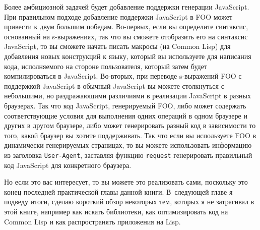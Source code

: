 Более амбициозной задачей будет добавление поддержки генерации JavaScript.  При правильном
подходе добавление поддержки JavaScript в FOO может привести к двум большим победам.
Во-первых, если вы определите синтаксис, основанный на s-выражениях, так что вы сможете
отобразить его на синтаксис JavaScript, то вы сможете начать писать макросы (на Common
Lisp) для добавления новых конструкций к языку, который вы используете для написания кода,
исполняемого на стороне пользователя, который затем будет компилироваться в JavaScript.
Во-вторых, при переводе s-выражений FOO с поддержкой JavaScript в обычный JavaScript вы
можете столкнуться с небольшими, но раздражающими различиями в реализации JavaScript в
разных браузерах.  Так что код JavaScript, генерируемый FOO, либо может содержать
соответствующие условия для выполнения одних операций в одном браузере и других в другом
браузере, либо может генерировать разный код в зависимости то того, какой браузер вы
хотите поддерживать.  Так что если вы используете FOO в динамически генерируемых
страницах, то вы можете использовать информацию из заголовка \lstinline{User-Agent},
заставляя функцию \lstinline{request} генерировать правильный код JavaScript для
конкретного браузера.

Но если это вас интересует, то вы можете это реализовать сами, поскольку это конец
последней практической главы данной книги.  В~следующей главе я подведу итоги, сделаю
короткий обзор некоторых тем, которых я не затрагивал в этой книге, например как искать
библиотеки, как оптимизировать код на Common Lisp и как распространять приложения на Lisp.

